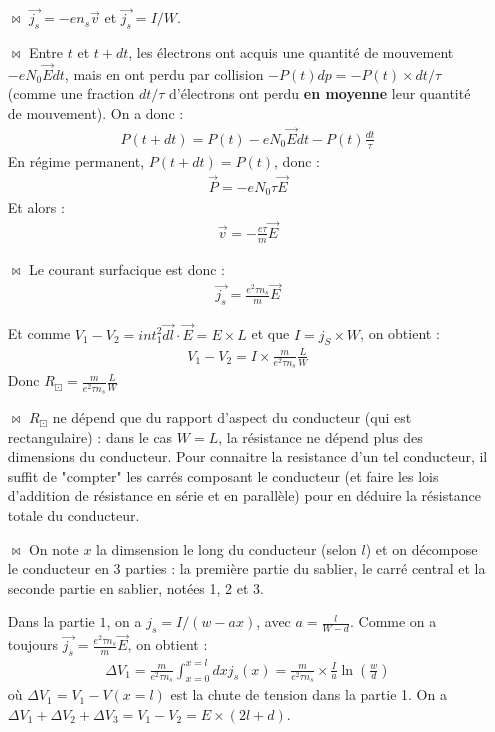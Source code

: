 \documentclass{report}
\begin{document}
\begin{itemize}

	\item[$\bowtie$] $\vec{j_s}=-en_s\vec{v}$ et $\vec{j_s}=I/W$.

	\item[$\bowtie$] Entre $t$ et $t+dt$, les électrons ont acquis une quantité de mouvement $-eN_0\vec{E}dt$, mais en ont perdu par collision $-P(t)dp=-P(t)\times dt/\tau$ (comme une fraction $dt/\tau$ d'électrons ont perdu \textbf{en moyenne} leur quantité de mouvement). On a donc :
	\begin{align*}
		P(t+dt) = P(t)-eN_0\vec{E}dt-P(t)\frac{dt}{\tau}
	\end{align*}
	En régime permanent, $P(t+dt) = P(t)$, donc :
	\begin{align*}
		\vec{P}=-eN_0\tau\vec{E}
	\end{align*}
	Et alors :
	\begin{align*}
		\vec{v}=-\frac{e\tau}{m}\vec{E}
	\end{align*}
	
	\item[$\bowtie$] Le courant surfacique est donc :
	\begin{align*}
		\vec{j_s}=\frac{e^2\tau n_s}{m}\vec{E}
	\end{align*}
	
	Et comme $V_1-V_2 = int_1^2\vec{dl}\cdot \vec{E}=E\times L$ et que $I=j_S\times W$, on obtient :
	\begin{align*}
		V_1-V_2 = I\times\frac{m}{e^2\tau n_s}\frac{L}{W}
	\end{align*}
	Donc $R_\boxdot = \frac{m}{e^2\tau n_s}\frac{L}{W}$
	
	\item[$\bowtie$] $R_\boxdot$ ne dépend que du rapport d'aspect du conducteur (qui est rectangulaire) : dans le cas $W=L$, la résistance ne dépend plus des dimensions du conducteur. Pour connaitre la resistance d'un tel conducteur, il suffit de "compter" les carrés composant le conducteur (et faire les lois d'addition de résistance en série et en parallèle) pour en déduire la résistance totale du conducteur.
	
	\item[$\bowtie$] On note $x$ la dimsension le long du conducteur (selon $l$) et on décompose le conducteur en 3 parties : la première partie du sablier, le carré central et la seconde partie en sablier, notées 1, 2 et 3.
	
	Dans la partie $1$, on a $j_s=I/(w-ax)$, avec $a=\frac{l}{W-d}$. Comme on a toujours $\vec{j_s}=\frac{e^2\tau n_s}{m}\vec{E}$, on obtient :
	\begin{align*}
		\Delta V_1=\frac{m}{e^2\tau n_s}\int_{x=0}^{x=l}dxj_s(x)=\frac{m}{e^2\tau n_s}\times\frac{I}{a}\ln\left(\frac{w}{d} \right) 
	\end{align*}
	où $\Delta V_1 = V_1-V(x=l)$ est la chute de tension dans la partie 1. On a $\Delta V_1+\Delta V_2+\Delta V_3=V_1-V_2 = E\times (2l+d) $.
	

\end{itemize}
\end{document}
